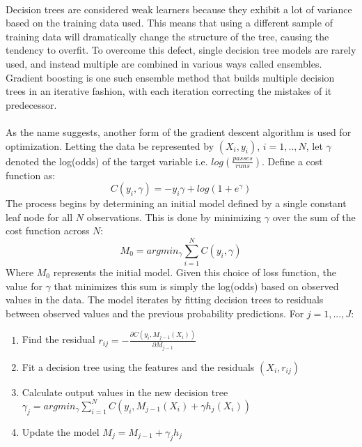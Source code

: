\documentclass[11pt]{article}
\begin{document}
\begin{multicols*}{2}
                \vspace{-10pt}

                \paragraph{}
                    Decision trees are considered weak learners because they exhibit a lot of variance based on the training data used. 
                    This means that using a different sample of training data will dramatically change the structure of the tree, causing the tendency to overfit.
                    To overcome this defect, single decision tree models are rarely used, and instead multiple are combined in various ways called ensembles. 
                    Gradient boosting is one such ensemble method that builds multiple decision trees in an iterative fashion, with each iteration correcting the mistakes of it predecessor.

                \vspace{-10pt}

                \paragraph{}
                    As the name suggests, another form of the gradient descent algorithm is used for optimization.
                    Letting the data be represented by $(X_i,y_i)$, $i=1,..,N$, let $\gamma$ denoted the log(odds) of the target variable i.e. $log(\frac{passes}{runs})$.
                    Define a cost function as: $$C(y_i, \gamma) = -y_i\gamma + log(1+e^\gamma)$$
                    The process begins by determining an initial model defined by a single constant leaf node for all $N$ observations. 
                    This is done by minimizing $\gamma$ over the sum of the cost function across $N$: $$M_0 = argmin_\gamma \sum_{i=1}^N C(y_i, \gamma)$$ 
                    Where $M_0$ represents the initial model. 
                    Given this choice of loss function, the value for $\gamma$ that minimizes this sum is simply the log(odds) based on observed values in the data.
                    The model iterates by fitting decision trees to residuals between observed values and the previous probability predictions.
                    For $j=1,...,J$:

                    \begin{enumerate}
                        \item Find the residual $r_{ij} = -\frac{\partial C(y_i,M_{j-1}(X_i))}{\partial M_{j-1}}$
                        \item Fit a decision tree using the features and the residuals $(X_i,r_{ij})$
                        \item Calculate output values in the new decision tree $\gamma_j = argmin_\gamma \sum_{i=1}^N C(y_i, M_{j-1}(X_i) + \gamma h_j(X_i))$ 
                        \item Update the model $M_j = M_{j-1} + \gamma_j h_j$
                    \end{enumerate}


\end{multicols*}
\end{document}

